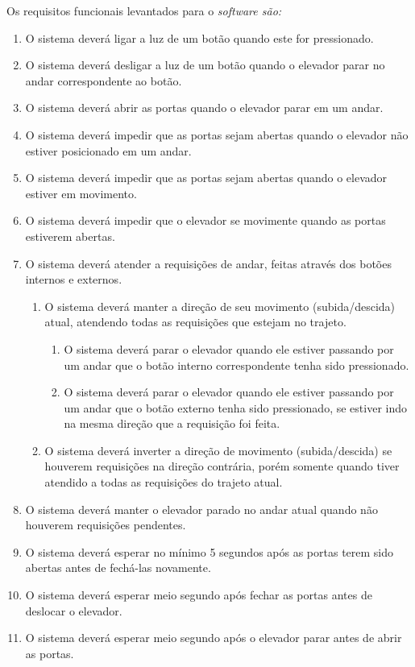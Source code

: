 Os requisitos funcionais levantados para o \it{software} são:

\begin{enumerate}[label=RF \arabic*. , ref=\arabic*]
	\item O sistema deverá ligar a luz de um botão quando este for pressionado.
  \item O sistema deverá desligar a luz de um botão quando o elevador parar no andar correspondente ao botão.
  \item O sistema deverá abrir as portas quando o elevador parar em um andar.
  \item O sistema deverá impedir que as portas sejam abertas quando o elevador não estiver posicionado em um andar.
  \item O sistema deverá impedir que as portas sejam abertas quando o elevador estiver em movimento.
  \item O sistema deverá impedir que o elevador se movimente quando as portas estiverem abertas.
  \item O sistema deverá atender a requisições de andar, feitas através dos botões internos e externos.
  \begin{enumerate}[label*=\arabic*.]
    \item O sistema deverá manter a direção de seu movimento (subida/descida) atual, atendendo todas as requisições que estejam no trajeto.
    \begin{enumerate}[label*=\arabic*.]
        \item O sistema deverá parar o elevador quando ele estiver passando por um andar que o botão interno correspondente tenha sido pressionado.
        \item O sistema deverá parar o elevador quando ele estiver passando por um andar que o botão externo tenha sido pressionado, se estiver indo na mesma direção que a requisição foi feita.
    \end{enumerate}
    \item O sistema deverá inverter a direção de movimento (subida/descida) se houverem requisições na direção contrária, porém somente quando tiver atendido a todas as requisições do trajeto atual.
  \end{enumerate}
  \item O sistema deverá manter o elevador parado no andar atual quando não houverem requisições pendentes.
  \item O sistema deverá esperar no mínimo 5 segundos após as portas terem sido abertas antes de fechá-las novamente.
  \item O sistema deverá esperar meio segundo após fechar as portas antes de deslocar o elevador.
  \item O sistema deverá esperar meio segundo após o elevador parar antes de abrir as portas.
\end{enumerate}

